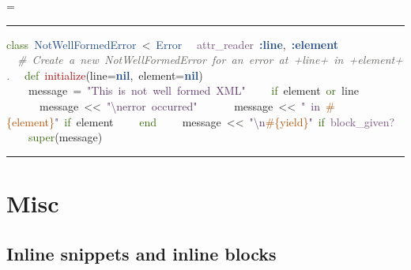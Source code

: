 \documentclass{article}
\makeatletter
\newcommand*{\ESHFontSize}{}
\newcommand*{\ESHFontFamily}{\ttfamily}
\newcommand*{\ESHBlockFontSize}{\ESHFontSize}
\newcommand*{\ESHBlockFontFamily}{\ESHFontFamily}
\newcommand*{\ESHBlockFont}{\ESHBlockFontSize\ESHBlockFontFamily}
\newcommand*{\ESHFallbackFontFamily}{\ESHFontFamily}
\newcommand*{\ESHFallbackFont}{\ESHFallbackFontFamily}
\newcommand*{\ESHNoHyphens}{\hyphenpenalty=10000}
\newcommand*{\ESHConstantSpace}{\spaceskip=\fontdimen2\font\xspaceskip=0pt}
\newcommand*{\ESHCenterInWidthOf}[2]
  {\settowidth\ESHtempdim{#1}%
   \makebox[\ESHtempdim][c]{#2}}
\newcommand*{\ESHIfFontChar}[1]
  {\iffontchar\font`#1{#1}\else{\ESHFallbackFont#1}\fi}
\def\ESHWithFallback#1{\ESHFallbackFont#1}}
\def\ESHWithFallback#1{\ESHIfFontChar{#1}}}}
\def\ESHWithFallback#1{%
     \ifnum\XeTeXfonttype\font>0%
       \ESHIfFontChar{#1}%
     \else%
       \setbox0=\hbox{\tracinglostchars=0\kern1sp#1\expandafter}%
       \ifnum\lastkern=1{\ESHFallbackFont#1}\else{#1}\fi
     \fi}}
\DeclareRobustCommand*{\ESHBlockSpecialChar}[1]
  {{\ESHCenterInWidthOf{\ESHBlockFontFamily{a}}{\ESHBlockFontFamily\ESHWithFallback{#1}}}}
\DeclareRobustCommand*{\ESHBlockUnicodeSubstitution}[1]
  {{\ESHCenterInWidthOf{\ESHBlockFontFamily{a}}{\ESHBlockFontFamily#1}}}
\newlength{\ESHCurFontSize}
\newcommand*{\ESHSetCurFontSize}{\setlength{\ESHCurFontSize}{\f@size pt}}
\DeclareRobustCommand*{\ESHInlineRaise}[2]
  {\ESHSetCurFontSize\raisebox{#1\ESHCurFontSize}{\relsize{-2}#2}}
\DeclareRobustCommand*{\ESHBlockRaise}[2]
  {\rlap{\ESHInlineRaise{#1}{#2}}\hphantom{#2}}
\newlength{\ESHBaselineskip}
\DeclareRobustCommand*{\ESHBlockStrut}[1]
  {\rule{0pt}{#1\ESHBaselineskip}}
\newcommand*{\ESHWeightBold}[1]{\textbf{#1}}
\newcommand*{\ESHBlockSlantItalic}[1]{{\itshape{#1}}} %
\newcommand*{\ESHNonbreakingSpace}{~}
\let\ESHSpecialChar\ignorespaces%
\let\ESHUnicodeSubstitution\ignorespaces%
\let\ESHRaise\ignorespaces%
\let\ESHBol\ignorespaces%
\let\ESHEol\ignorespaces%
\let\ESHSpace\ignorespaces%
\let\ESHDash\ignorespaces%
\let\ESHSlantItalic\ignorespaces%
\DeclareRobustCommand*{\ESHBlockInternalSetup}
  {\def\ESHSpecialChar{\ESHBlockSpecialChar}\def\ESHUnicodeSubstitution{\ESHBlockUnicodeSubstitution}%
   \def\ESHRaise{\ESHBlockRaise}\def\ESHSlantItalic{\ESHBlockSlantItalic}%
   \setlength{\ESHBaselineskip}{\baselineskip}\def\ESHStrut{\ESHBlockStrut}%
   \def\ESHBol{\-}\def\ESHEol{\newline}\def\ESHSpace{\ESHNonbreakingSpace}\def\ESHDash{\hbox{-}\nobreak}}
\newcommand*{\ESHBlockBasicSetup}
  {\setlength{\parindent}{0pt}\raggedright\ESHNoHyphens%
   \ESHBlockFont\ESHConstantSpace}
\newcommand*{\ESHHook}{}
\newcommand*{\ESHBlockHook}{\ESHHook}
\newlength{\ESHSkip}
\newcommand*{\ESHNoBreakAddVSpace}[1]{\addpenalty{\@M}\addvspace{#1}}
\newenvironment{ESHBlock}
  {\par\ESHNoBreakAddVSpace{\ESHSkip}\bgroup\ESHBlockInternalSetup\ESHBlockBasicSetup\ESHBlockHook}
  {\par\egroup\addvspace{\ESHSkip}}
\renewcommand{\ESHFontFamily}{\UbuntuMono}
\renewcommand{\ESHFallbackFontFamily}{\XITSMath}
\renewenvironment{ESHBlock}{%
  \par\ESHNoBreakAddVSpace{\ESHSkip}\bgroup\ESHBlockInternalSetup\ESHBlockBasicSetup%
  \hrule\addvspace{0.5em}%
}{%
  \par\egroup\addvspace{0.5em}\hrule\addvspace{2\ESHSkip}%
}
\makeatother
\begin{document}
\begin{ESHBlock}
\ESHBol{}\textcolor[HTML]{346604}{class}\ESHSpace{}\textcolor[HTML]{204A87}{NotWellFormedError}\ESHSpace{}{<}\ESHSpace{}\textcolor[HTML]{204A87}{Error}\ESHEol
\ESHBol{}\ESHSpace{}\ESHSpace{}\textcolor[HTML]{75507B}{attr\_reader}\ESHSpace{}\ESHWeightBold{\textcolor[HTML]{204A87}{:line}},\ESHSpace{}\ESHWeightBold{\textcolor[HTML]{204A87}{:element}}\ESHEol
\ESHBol{}\mbox{}\ESHEol
\ESHBol{}\ESHSpace{}\ESHSpace{}\ESHSlantItalic{\textcolor[HTML]{5F615C}{\#\ESHSpace{}Create\ESHSpace{}a\ESHSpace{}new\ESHSpace{}NotWellFormedError\ESHSpace{}for\ESHSpace{}an\ESHSpace{}error\ESHSpace{}at\ESHSpace{}+line+\ESHSpace{}in\ESHSpace{}+element+.}}\ESHEol
\ESHBol{}\ESHSpace{}\ESHSpace{}\textcolor[HTML]{346604}{def}\ESHSpace{}\textcolor[HTML]{A40000}{initialize}(line=\ESHWeightBold{\textcolor[HTML]{204A87}{nil}},\ESHSpace{}element=\ESHWeightBold{\textcolor[HTML]{204A87}{nil}})\ESHEol
\ESHBol{}\ESHSpace{}\ESHSpace{}\ESHSpace{}\ESHSpace{}message\ESHSpace{}=\ESHSpace{}\textcolor[HTML]{5C3566}{"This\ESHSpace{}is\ESHSpace{}not\ESHSpace{}well\ESHSpace{}formed\ESHSpace{}XML"}\ESHEol
\ESHBol{}\ESHSpace{}\ESHSpace{}\ESHSpace{}\ESHSpace{}\textcolor[HTML]{346604}{if}\ESHSpace{}element\ESHSpace{}\textcolor[HTML]{346604}{or}\ESHSpace{}line\ESHEol
\ESHBol{}\ESHSpace{}\ESHSpace{}\ESHSpace{}\ESHSpace{}\ESHSpace{}\ESHSpace{}message\ESHSpace{}{<}{<}\ESHSpace{}\textcolor[HTML]{5C3566}{"\textbackslash{}nerror\ESHSpace{}occurred"}\ESHEol
\ESHBol{}\ESHSpace{}\ESHSpace{}\ESHSpace{}\ESHSpace{}\ESHSpace{}\ESHSpace{}message\ESHSpace{}{<}{<}\ESHSpace{}\textcolor[HTML]{5C3566}{"\ESHSpace{}in\ESHSpace{}}\textcolor[HTML]{B35000}{\#\{element\}}\textcolor[HTML]{5C3566}{"}\ESHSpace{}\textcolor[HTML]{346604}{if}\ESHSpace{}element\ESHEol
\ESHBol{}\ESHSpace{}\ESHSpace{}\ESHSpace{}\ESHSpace{}\textcolor[HTML]{346604}{end}\ESHEol
\ESHBol{}\ESHSpace{}\ESHSpace{}\ESHSpace{}\ESHSpace{}message\ESHSpace{}{<}{<}\ESHSpace{}\textcolor[HTML]{5C3566}{"\textbackslash{}n}\textcolor[HTML]{B35000}{\#\{yield\}}\textcolor[HTML]{5C3566}{"}\ESHSpace{}\textcolor[HTML]{346604}{if}\ESHSpace{}\textcolor[HTML]{75507B}{block\_given?}\ESHEol
\ESHBol{}\ESHSpace{}\ESHSpace{}\ESHSpace{}\ESHSpace{}\textcolor[HTML]{346604}{super}(message)
\end{ESHBlock}

\section*{Misc}

\subsection*{Inline snippets and inline blocks}
\end{document}
